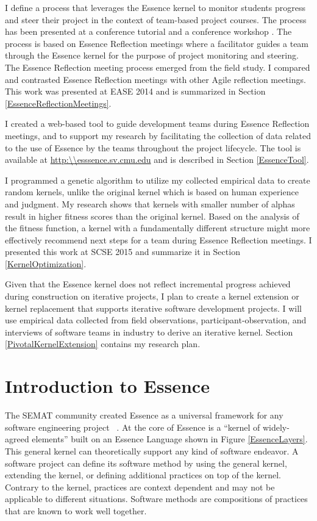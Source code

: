 \documentclass[preprint,12pt,3p]{elsarticle}
\begin{document}
I define a process that leverages the Essence kernel to monitor students progress and steer their project in the context of team-based project courses. The process has been presented at a conference tutorial \cite{SCSE2015Tutorial} and a conference workshop \cite{CSEET2015Workshop}. The process is based on Essence Reflection meetings where a facilitator guides a team through the Essence kernel for the purpose of project monitoring and steering. The Essence Reflection meeting process emerged from the field study. I compared and contrasted Essence Reflection meetings with other Agile reflection meetings. This work was presented at EASE 2014 \cite{EASE2014} and is summarized in Section \ref{EssenceReflectionMeetings}.

I created a web-based tool to guide development teams during Essence Reflection meetings, and to support my research by facilitating the collection of data related to the use of Essence by the teams throughout the project lifecycle. The tool is available at \url{http:\\esssence.sv.cmu.edu} and is described in Section \ref{EssenceTool}.

I programmed a genetic algorithm to utilize my collected empirical data to create random kernels, unlike the original kernel which is based on human experience and judgment. My research shows that kernels with smaller number of alphas result in higher fitness scores than the original kernel. Based on the analysis of the fitness function, a kernel with a fundamentally different structure might more effectively recommend next steps for a team during Essence Reflection meetings. I presented this work at SCSE 2015 and summarize it in Section \ref{KernelOptimization}.

Given that the Essence kernel does not reflect incremental progress achieved during construction on iterative projects, I plan to create a kernel extension or kernel replacement that supports iterative software development projects. I will use empirical data collected from field observations, participant-observation, and interviews of software teams in industry to derive an iterative kernel. Section \ref{PivotalKernelExtension} contains my research plan.

\section{Introduction to Essence}
\label{Method}

The SEMAT community created Essence as a universal framework for any software engineering project ~\cite{JacobsonQueue}. At the core of Essence is a ``kernel of widely-agreed elements'' built on an Essence Language shown in Figure \ref{EssenceLayers}. This general kernel can theoretically support any kind of software endeavor. A software project can define its software method by using the general kernel, extending the kernel, or defining additional practices on top of the kernel. Contrary to the kernel, practices are context dependent and may not be applicable to different situations. Software methods are compositions of practices that are known to work well together.
\end{document}

